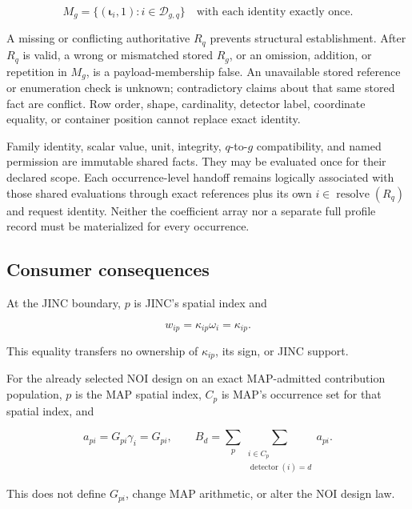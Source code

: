 \begin{equation}
 M_g=\{(\boldsymbol\iota_i,1):i\in\mathcal D_{g,q}\}
 \quad\text{with each identity exactly once}.
 \label{eq:enumerated}
\end{equation}

A missing or conflicting authoritative \(R_q\) prevents structural
establishment. After \(R_q\) is valid, a wrong or mismatched stored
\(\widehat R_g\), or an omission, addition, or repetition in \(M_g\), is a
payload-membership false. An unavailable stored reference or enumeration
check is unknown; contradictory claims about that same stored fact are
conflict. Row order, shape, cardinality, detector label, coordinate equality,
or container position cannot replace exact identity.

Family identity, scalar value, unit, integrity, \(q\)-to-\(g\) compatibility,
and named permission are immutable shared facts. They may be evaluated once
for their declared scope. Each occurrence-level handoff remains logically
associated with those shared evaluations through exact references plus its
own \(i\in\operatorname{resolve}(R_q)\) and request identity. Neither the
coefficient array nor a separate full profile record must be materialized for
every occurrence.

\subsection{Consumer consequences}

At the JINC boundary, \(p\) is JINC's spatial index and

\begin{equation}
 w_{ip}=\kappa_{ip}\omega_i=\kappa_{ip}.
 \label{eq:jinc}
\end{equation}

This equality transfers no ownership of \(\kappa_{ip}\), its sign, or JINC
support.

For the already selected NOI design on an exact MAP-admitted contribution
population, \(p\) is the MAP spatial index, \(C_p\) is MAP's occurrence set for
that spatial index, and

\begin{equation}
 a_{pi}=G_{pi}\gamma_i=G_{pi},\qquad
 B_d=\sum_p\sum_{\substack{i\in C_p\\
             \operatorname{detector}(i)=d}}a_{pi}.
 \label{eq:noi}
\end{equation}

This does not define \(G_{pi}\), change MAP arithmetic, or alter the NOI
design law.


